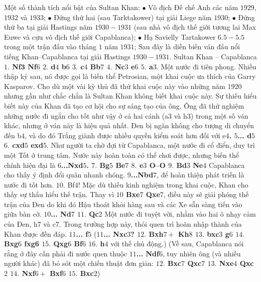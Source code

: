 \begin{multicols}{2}
	\vskip 0.1cm
	Một số thành tích nổi bật của Sultan Khan:  
	\vskip 0.1cm
	$\bullet$	Vô địch Đế chế Anh các năm $1929$, $1932$ và $1933$;
	\vskip 0.1cm 
	$\bullet$	Đứng thứ hai (sau Tarktakower) tại giải Liege năm $1930$;
	\vskip 0.1cm 
	$\bullet$	Đứng thứ ba tại giải Hastings năm $1930-1931$ (sau nhà vô địch thế giới tương lai Max Euwe và cựu vô địch thế giới Capablanca);
	\vskip 0.1cm
	$\bullet$	Hạ Savielly Tartakower $6{.}5-5{.}5$ trong một trận đấu vào tháng $1$ năm $1931$;
	\vskip 0.1cm
	Sau đây là diễn biến ván đấu nổi tiếng Khan--Capablanca tại giải Hastings $1930-1931$.
	\vskip 0.1cm
	Sultan Khan -- Capablanca
	\vskip 0.1cm
	\textbf{\color{gocco}$1.$ Nf$\pmb{3}$ Nf$6$ $2.$ d$4$ b$6$ $3.$ c$4$ Bb$7$ $4.$ Nc$3$ e$6$ $5.$ a$3$}. Một nước đi tiên phong. Nhiều thập kỷ sau, nó được gọi là biến thể Petrosian, một khai cuộc ưa thích của Garry Kasparov. Cho dù một vài kỳ thủ đã thử khai cuộc  này vào những năm $1920$ nhưng gần như chắc chắn là Sultan Khan không biết khai cuộc này. Sự thiếu hiểu biết này của Khan đã tạo cơ hội cho sự sáng tạo của ông. Ông đã thử nghiệm những nước đi ngắn cho tốt như vậy ở cả hai cánh (a$3$ và h$3$) trong một số ván khác, nhưng ở ván này là hiệu quả nhất. Đen bị ngăn không cho tượng di chuyển đến b$4$, và do đó Trắng giành được nhiều quyền kiểm soát hơn đối với e\textbf{\color{gocco}$4$. $5$... d$5$ $6.$ cxd$5$ exd$5$}. Như người ta chờ đợi từ Capablanca, một nước đi cổ điển, duy trì một Tốt ở trung tâm. Nước này hoàn toàn có thể chơi được, nhưng biến thể chính hiện đại là \textbf{\color{gocco}$6$...Nxd$5$. $7.$ Bg$5$ Be$7$ $8.$ e$3$ O--O $9.$ Bd$3$ Ne$4$} Capablanca cho thấy ý định đổi quân nhanh chóng. \textbf{\color{gocco}$9$...Nbd$7$}, để hoàn thiện phát triến là nước đi tốt hơn. $10.$ Bf$4$! Mặc dù thiếu kinh nghiệm trong khai cuộc, Khan cho thấy sự thấu hiểu thế trận. Thay vì \textbf{\color{gocco}$10$ Bxe$7$ Qxe$7$}, điều này sẽ giải phóng thế trận của Đen do khi đó Hậu thoát khỏi hàng sau và các Xe sẵn sàng tiến vào giữa bàn cờ. \textbf{\color{gocco}$10$... Nd$7$ $11.$ Qc$2$} Một nước đi tuyệt vời, nhằm vào hai ô nhạy cảm của Đen, h$7$ và c$7$. Trong trường hợp này, thói quen trì hoãn nhập thành của Khan được đền đáp. \textbf{\color{gocco}$11$... f$5$} 
	\vskip 0.1cm
	(\textbf{\color{gocco}$11$... Nxc$3$? $12.$ Bxh$7+$ Kh$8$ $13.$ bxc$3$ g$6$ $14.$ Bxg$6$ fxg6 $15.$ Qxg$6$ Bf$6$ $16.$ h$4$} với thế chủ động.) 
	\vskip 0.1cm
	(Về sau, Capablanca nói rằng ở đây cần phải đi nước quen thuộc \textbf{\color{gocco}$11$... Ndf$6$}, tuy nhiên ông (và nhiều người khác) đã bỏ sót một chiến thuật đơn giản: \textbf{\color{gocco}$12.$ Bxc$7$ Qxc$7$ $13.$ Nxe$4$ Qxc$2$ $14.$ Nxf$6+$ Bxf$6$ $15.$ Bxc$2$})

\end{multicols}
